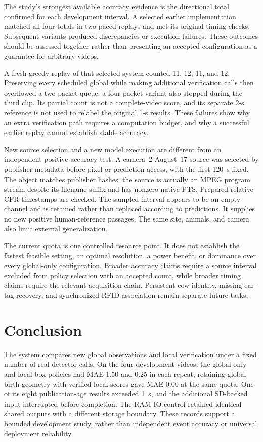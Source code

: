 \documentclass[journal]{IEEEtran}
\begin{document}
The study's strongest available accuracy evidence is the directional total confirmed for each development interval. A selected earlier implementation matched all four totals in two paced replays and met its original timing checks. Subsequent variants produced discrepancies or execution failures. These outcomes should be assessed together rather than presenting an accepted configuration as a guarantee for arbitrary videos.

A fresh greedy replay of that selected system counted 11, 12, 11, and 12. Preserving every scheduled global while making additional verification calls then overflowed a two-packet queue; a four-packet variant also stopped during the third clip. Its partial count is not a complete-video score, and its separate 2-s reference is not used to relabel the original 1-s results. These failures show why an extra verification path requires a computation budget, and why a successful earlier replay cannot establish stable accuracy.

New source selection and a new model execution are different from an independent positive accuracy test. A camera~2 August~17 source was selected by publisher metadata before pixel or prediction access, with the first 120~s fixed. The object matches publisher hashes; the source is actually an MPEG program stream despite its filename suffix and has nonzero native PTS. Prepared relative CFR timestamps are checked. The sampled interval appears to be an empty channel and is retained rather than replaced according to predictions. It supplies no new positive human-reference passages. The same site, animals, and camera also limit external generalization.

The current quota is one controlled resource point. It does not establish the fastest feasible setting, an optimal resolution, a power benefit, or dominance over every global-only configuration. Broader accuracy claims require a source interval excluded from policy selection with an accepted count, while broader timing claims require the relevant acquisition chain. Persistent cow identity, missing-ear-tag recovery, and synchronized RFID association remain separate future tasks.

\section{Conclusion}
The system compares new global observations and local verification under a fixed number of real detector calls. On the four development videos, the global-only and local-box policies had MAE 1.50 and 0.25 in each repeat; retaining global birth geometry with verified local scores gave MAE 0.00 at the same quota. One of its eight publication-age results exceeded 1~s, and the additional SD-backed input interrupted before completion. The RAM IO control retained identical shared outputs with a different storage boundary. These records support a bounded development study, rather than independent event accuracy or universal deployment reliability.
\end{document}
